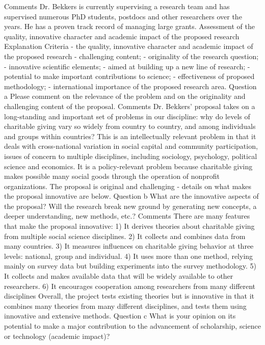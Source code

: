 \documentclass[twocolumn, serif, rga, numeric]{jote-article}
\begin{document}
Comments
Dr. Bekkers is currently supervising a research team and has supervised numerous PhD students, postdocs and other researchers over the years. He has a proven track record of managing large grants.
Assessment of the quality, innovative character and academic impact of the proposed research
Explanation
Criteria - the quality, innovative character and academic impact of the proposed research - challenging content; - originality of the research question; - innovative scientific elements; - aimed at building up a new line of research; - potential to make important contributions to science; - effectiveness of proposed methodology; - international importance of the proposed research area.
Question a
Please comment on the relevance of the problem and on the originality and challenging content of the proposal.
Comments
Dr. Bekkers' proposal takes on a long-standing and important set of problems in our discipline: why do levels of charitable giving vary so widely from country to country, and among individuals and groups within countries? This is an intellectually relevant problem in that it deals with cross-national variation in social capital and community participation, issues of concern to multiple disciplines, including sociology, psychology, political science and economics. It is a policy-relevant problem because charitable giving makes possible many social goods through the operation of nonprofit organizations. The proposal is original and challenging - details on what makes the proposal innovative are below.
Question b
What are the innovative aspects of the proposal? Will the research break new ground by generating new concepts, a deeper understanding, new methods, etc.?
Comments
There are many features that make the proposal innovative:
1) It derives theories about charitable giving from multiple social science disciplines.
2) It collects and combines data from many countries.
3) It measures influences on charitable giving behavior at three levels: national, group and individual.
4) It uses more than one method, relying mainly on survey data but building experiments into the survey methodology.
5) It collects and makes available data that will be widely available to other researchers.
6) It encourages cooperation among researchers from many different disciplines
Overall, the project tests existing theories but is innovative in that it combines many theories from many different disciplines, and tests them using innovative and extensive methods.
Question c
What is your opinion on its potential to make a major contribution to the advancement of scholarship, science or technology (academic impact)?
\end{document}
